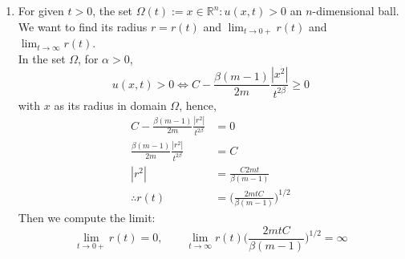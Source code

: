 \documentclass[a4paper,9pt]{article}
\newcommand{\R}{\mathbb{R}}
\begin{document}
\begin{enumerate}
\begin{enumerate}
		\item For given $t>0$, the set $\Omega(t) := {x \in \R^n : u(x,t)>0}$ an $n$-dimensional ball. We want to find its radius $r = r(t)$ and $\lim_{t\rightarrow 0+} r(t)$ and $\lim_{t\rightarrow \infty} r(t)$.\\
		In the set $\Omega$, for $\alpha > 0$, $$u(x,t)>0 \iff C - \frac{\beta(m-1)}{2m} \frac{|x^2|}{t^{2\beta}} \geq 0$$
		with $x$ as its radius in domain $\Omega$, hence,
		\begin{equation}\label{eq:23}
		\begin{aligned}
		C - \frac{\beta(m-1)}{2m} \frac{|r^2|}{t^{2\beta}} &= 0\\
		\frac{\beta(m-1)}{2m} \frac{|r^2|}{t^{2\beta}} &= C\\
		|r^2| &= \frac{C 2m t}{\beta (m-1)}\\
		\therefore r(t) &= \bigg(\frac{2m t C}{\beta (m-1)}\bigg)^{1/2}
		\end{aligned}
		\end{equation}
		Then we compute the limit:
		\begin{equation}
		\lim_{t\rightarrow 0+} r(t) = 0,\qquad \lim_{t\rightarrow \infty} r(t) \bigg(\frac{2m t C}{\beta (m-1)}\bigg)^{1/2} = \infty
		\end{equation}
		

\end{enumerate}
\end{enumerate}
\end{document}
